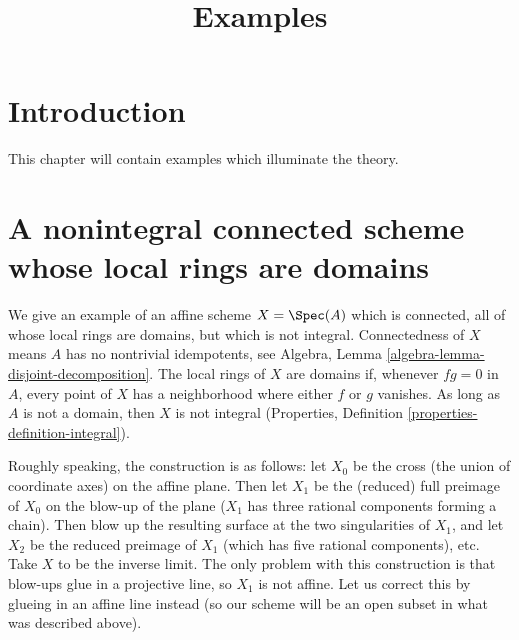 

%


\title{Examples}


\maketitle

\label{section-phantom}

\tableofcontents

\section{Introduction}
\label{section-introduction}

\noindent
This chapter will contain examples which illuminate the theory.






\section{A nonintegral connected scheme whose local rings are domains}
\label{section-connected-locally-integral-not-integral}

\noindent
We give an example of an affine scheme $X = \Spec(A)$ which is
connected, all of whose local rings are domains, but which is not integral.
Connectedness of $X$ means $A$ has no nontrivial idempotents, see
Algebra, Lemma \ref{algebra-lemma-disjoint-decomposition}.
The local rings of $X$ are domains if, whenever $fg = 0$ in $A$, every
point of $X$ has a neighborhood where either $f$ or $g$ vanishes.
As long as $A$ is not a domain, then $X$ is not integral
(Properties, Definition \ref{properties-definition-integral}).

\medskip\noindent
Roughly speaking, the construction is as follows: let $X_0$ be the cross
(the union of coordinate axes) on the affine plane. Then let $X_1$ be
the (reduced) full preimage of $X_0$ on the blow-up of the plane ($X_1$
has three rational components forming a chain).  Then blow up the
resulting surface at the two singularities of $X_1$, and let $X_2$ be
the reduced preimage of $X_1$ (which has five rational components), etc.
Take $X$ to be the inverse limit. The only problem with this construction
is that blow-ups glue in a projective line, so $X_1$ is not affine. Let us
correct this by glueing in an affine line instead (so our scheme will be an
open subset in what was described above).

